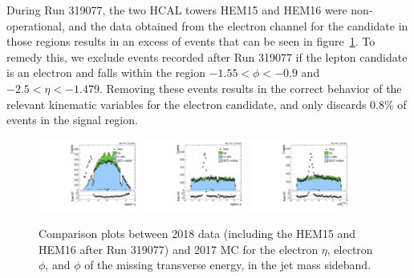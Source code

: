 During Run 319077, the two HCAL towers HEM15 and HEM16 were non-operational, and the data obtained from the electron channel for the \Wtolnu candidate in those regions results in an excess of events that can be seen in figure~\ref{fig:SB_controlPlots2018_electronexcess}. %
To remedy this, we exclude events recorded after Run 319077 if the lepton candidate is an electron and falls within the region $-1.55<\phi<-0.9$ and $-2.5<\eta<-1.479$.
Removing these events results in the correct behavior of the relevant kinematic variables for the electron candidate, and only discards 0.8\% of events in the signal region.

\begin{figure}[htbp]
  \centering
  \includegraphics[width=0.30\textwidth]{fig/controlPlots/SB_e_2018_lnujj_l1_l_eta.pdf}
  \includegraphics[width=0.30\textwidth]{fig/controlPlots/SB_e_2018_lnujj_l1_l_phi.pdf}
  \includegraphics[width=0.30\textwidth]{fig/controlPlots/SB_e_2018_met_phi.pdf}
  \caption{
    Comparison plots between 2018 data (including the HEM15 and HEM16 after Run 319077) and 2017 MC for the electron $\eta$, electron $\phi$, and $\phi$ of the missing transverse energy, in the jet mass sideband.
  }
  \label{fig:SB_controlPlots2018_electronexcess}
\end{figure}
